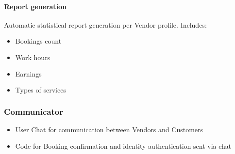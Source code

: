 \documentclass[11pt,a4paper]{article}
\begin{document}
\paragraph{Report generation}

Automatic statistical report generation per Vendor profile. Includes:
\begin{itemize}
  \item Bookings count
  \item Work hours
  \item Earnings
  \item Types of services
\end{itemize}

\subsubsection{Communicator}
\begin{itemize}
  \item User Chat for communication between Vendors and Customers
  \item Code for Booking confirmation and identity authentication sent via chat
\end{itemize}
\end{document}
